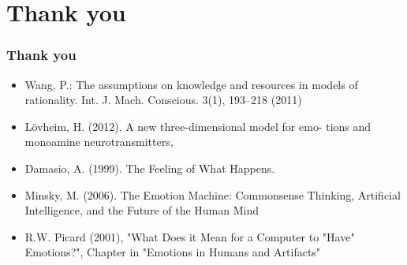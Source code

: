 \documentclass[12pt, aspectratio=169]{beamer}
\begin{document}
\section{Thank you}
\begin{frame}

\frametitle{Thank you}
\begin{itemize}
\item Wang, P.: The assumptions on knowledge and resources in models of rationality. Int. J. Mach. Conscious. 3(1), 193–218 (2011)
\item L\"{o}vheim, H. (2012). A new three-dimensional model for emo- tions and monoamine neurotransmitters,
\item Damasio, A. (1999). The Feeling of What Happens.
\item Minsky, M. (2006). The Emotion Machine: Commonsense Thinking, Artificial Intelligence, and the Future of the Human Mind
\item R.W. Picard (2001), "What Does it Mean for a Computer to "Have" Emotions?", Chapter in "Emotions in Humans and Artifacts" 
\end{itemize}


\end{frame}

\end{document}
